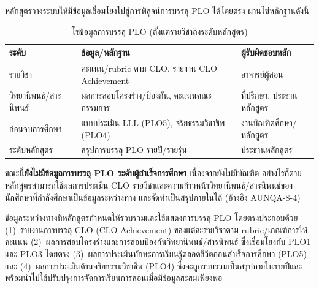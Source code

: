 
หลักสูตรวางระบบให้มีข้อมูลเชื่อมโยงไปสู่การพิสูจน์การบรรลุ PLO ได้โดยตรง ผ่านโซ่หลักฐานดังนี้

\begin{table}[H]
  \centering
  \caption{โซ่ข้อมูลการบรรลุ PLO (ตั้งแต่รายวิชาถึงระดับหลักสูตร)}
  \label{tbl:c8_plo_chain}
  \begingroup
  \small
  \begin{tabularx}{\linewidth}{|>{\raggedright\arraybackslash}p{2.8cm}|Y|>{\raggedright\arraybackslash}p{2.6cm}|}
    \hline
    \textbf{ระดับ} & \textbf{ข้อมูล/หลักฐาน} & \textbf{ผู้รับผิดชอบหลัก} \\
    \hline
    รายวิชา & คะแนน/rubric ตาม CLO, รายงาน CLO Achievement & อาจารย์ผู้สอน \\
    \hline
    วิทยานิพนธ์/สารนิพนธ์ & ผลการสอบโครงร่าง/ป้องกัน, คะแนนคณะกรรมการ & ที่ปรึกษา, ประธานหลักสูตร \\
    \hline
    ก่อนจบการศึกษา & แบบประเมิน LLL (PLO5), จริยธรรมวิชาชีพ (PLO4) & งานบัณฑิตศึกษา/หลักสูตร \\
    \hline
    ระดับหลักสูตร & สรุปการบรรลุ PLO รายปี/รายรุ่น & ประธานหลักสูตร \\
    \hline
  \end{tabularx}
  \endgroup
\end{table}

ขณะนี้\textbf{ยังไม่มีข้อมูลการบรรลุ PLO ระดับผู้สำเร็จการศึกษา} เนื่องจากยังไม่มีบัณฑิต อย่างไรก็ตาม หลักสูตรสามารถใช้ผลการประเมิน CLO รายวิชาและความก้าวหน้าวิทยานิพนธ์/สารนิพนธ์ของนักศึกษาที่กำลังศึกษาเป็นข้อมูลระหว่างทาง และจัดทำเป็นสรุปภายในได้ (อ้างอิง AUNQA-8-4)

ข้อมูลระหว่างทางที่หลักสูตรกำหนดให้รวบรวมและใช้แสดงการบรรลุ PLO โดยตรงประกอบด้วย (1)~รายงานการบรรลุ CLO (CLO Achievement) ของแต่ละรายวิชาตาม rubric/เกณฑ์การให้คะแนน (2)~ผลการสอบโครงร่างและการสอบป้องกันวิทยานิพนธ์/สารนิพนธ์ ซึ่งเชื่อมโยงกับ PLO1 และ PLO3 โดยตรง (3)~ผลการประเมินทักษะการเรียนรู้ตลอดชีวิตก่อนสำเร็จการศึกษา (PLO5) และ (4)~ผลการประเมินด้านจริยธรรมวิชาชีพ (PLO4) ซึ่งจะถูกรวบรวมเป็นสรุปภายในรายปีและพร้อมนำไปใช้ปรับปรุงการจัดการเรียนการสอนเมื่อมีข้อมูลสะสมเพียงพอ


